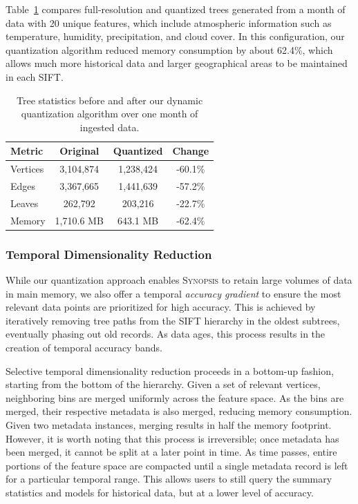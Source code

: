 \documentclass[9pt,journal,compsoc]{IEEEtran}
\begin{document}
Table~\ref{tbl:tree-stats} compares full-resolution and quantized trees generated from a month of data with 20 unique features, which include atmospheric information such as temperature, humidity, precipitation, and cloud cover. In this configuration, our quantization algorithm reduced memory consumption by about 62.4\%, which allows much more historical data and larger geographical areas to be maintained in each SIFT.
%
\begin{table}[h!]
    \renewcommand{\arraystretch}{1.2}
    \caption{Tree statistics before and after our dynamic quantization algorithm over one month of ingested data.\vspace{-1em}}
    \label{tbl:tree-stats}
    \begin{center}
        \begin{tabular}{|l|c|c|c|}
            \hline
            \textbf{Metric} & \textbf{Original} & \textbf{Quantized} & \textbf{Change} \\
            \hline
            Vertices & 3,104,874 & 1,238,424 & -60.1\% \\
            \hline
            Edges    & 3,367,665 & 1,441,639 & -57.2\% \\
            \hline
            Leaves   & 262,792   & 203,216   & -22.7\% \\
            \hline
            Memory   & 1,710.6 MB & 643.1 MB  & -62.4\% \\
            \hline
        \end{tabular}
    \end{center}
\end{table}

\vspace{-2em}

\subsubsection{Temporal Dimensionality Reduction}
While our quantization approach enables \textsc{Synopsis} to retain large volumes of data in main memory, we also offer a temporal \emph{accuracy gradient} to ensure the most relevant data points are prioritized for high accuracy. This is achieved by iteratively removing tree paths from the SIFT hierarchy in the oldest subtrees, eventually phasing out old records. As data ages, this process results in the creation of temporal accuracy bands.

Selective temporal dimensionality reduction proceeds in a bottom-up fashion, starting from the bottom of the hierarchy. Given a set of relevant vertices, neighboring bins are merged uniformly across the feature space. As the bins are merged, their respective metadata is also merged, reducing memory consumption. Given two metadata instances, merging results in half the memory footprint. However, it is worth noting that this process is irreversible; once metadata has been merged, it cannot be split at a later point in time. As time passes, entire portions of the feature space are compacted until a single metadata record is left for a particular temporal range. This allows users to still query the summary statistics and models for historical data, but at a lower level of accuracy.
\end{document}
